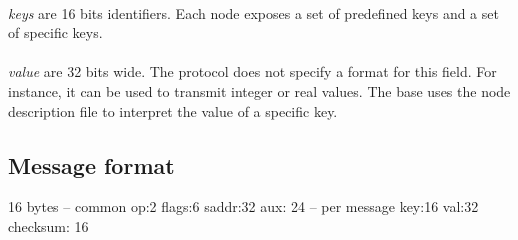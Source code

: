 \documentclass[a4paper, 11pt]{article}
\begin{document}
\paragraph{}
\textit{keys} are 16 bits identifiers. Each node exposes a set of predefined keys
and a set of specific keys.
\paragraph{}
\textit{value} are 32 bits wide. The protocol does not specify a format for this
field. For instance, it can be used to transmit integer or real values. The base
uses the node description file to interpret the value of a specific key.

\subsection{Message format}
16 bytes
-- common
op:2
flags:6
saddr:32
aux: 24
-- per message
key:16
val:32
checksum: 16

\end{document}

